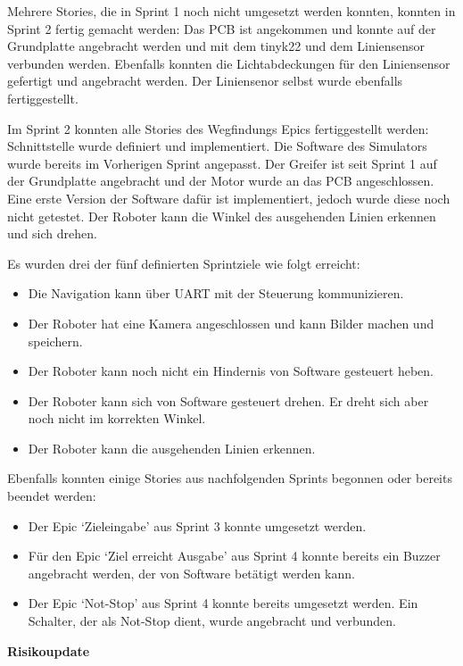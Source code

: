 Mehrere Stories, die in Sprint 1 noch nicht umgesetzt werden konnten, konnten in Sprint 2 fertig gemacht werden: Das PCB ist angekommen und konnte auf der Grundplatte angebracht werden und mit dem \gls{tinyk22} und dem Liniensensor verbunden werden. Ebenfalls konnten die Lichtabdeckungen für den Liniensensor gefertigt und angebracht werden. Der Liniensenor selbst wurde ebenfalls fertiggestellt.

Im Sprint 2 konnten alle Stories des Wegfindungs Epics fertiggestellt werden: Schnittstelle wurde definiert und implementiert. Die Software des Simulators wurde bereits im Vorherigen Sprint angepasst.
Der Greifer ist seit Sprint 1 auf der Grundplatte angebracht und der Motor wurde an das PCB angeschlossen. Eine erste Version der Software dafür ist implementiert, jedoch wurde diese noch nicht getestet. Der Roboter kann die Winkel des ausgehenden Linien erkennen und sich drehen.

Es wurden drei der fünf definierten Sprintziele wie folgt erreicht:
\begin{itemize}
    \item Die Navigation kann über UART mit der Steuerung kommunizieren.
    \item Der Roboter hat eine Kamera angeschlossen und kann Bilder machen und speichern.
    \item Der Roboter kann noch nicht ein Hindernis von Software gesteuert heben.
    \item Der Roboter kann sich von Software gesteuert drehen. Er dreht sich aber noch nicht im korrekten Winkel.
    \item Der Roboter kann die ausgehenden Linien erkennen.
\end{itemize}

Ebenfalls konnten einige Stories aus nachfolgenden Sprints begonnen oder bereits beendet werden:
\begin{itemize}
    \item Der Epic `Zieleingabe' aus Sprint 3 konnte umgesetzt werden.
    \item Für den Epic `Ziel erreicht Ausgabe' aus Sprint 4 konnte bereits ein Buzzer angebracht werden, der von Software betätigt werden kann.
    \item Der Epic `Not-Stop' aus Sprint 4 konnte bereits umgesetzt werden. Ein Schalter, der als Not-Stop dient, wurde angebracht und verbunden.
\end{itemize}


\textbf{Risikoupdate}
\label{risks-sprint-2}

